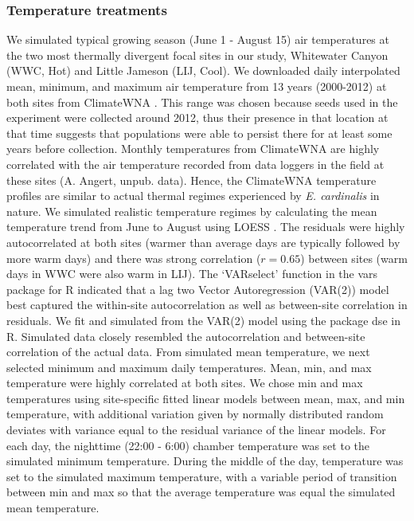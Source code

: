 \documentclass[11pt, oneside]{article}
\newcommand{\pkg}[1]{{\fontseries{b}\selectfont #1}}
\begin{document}
\subsubsection*{Temperature treatments}

We simulated typical growing season (June 1 - August 15) air temperatures at the two most thermally divergent focal sites in our study, Whitewater Canyon (WWC, Hot) and Little Jameson (LIJ, Cool). We downloaded daily interpolated mean, minimum, and maximum air temperature from 13 years (2000-2012) at both sites from ClimateWNA \citep{Wang_etal_2012}. This range was chosen because seeds used in the experiment were collected around 2012, thus their presence in that location at that time suggests that populations were able to persist there for at least some years before collection. Monthly temperatures from ClimateWNA are highly correlated with the air temperature recorded from data loggers in the field at these sites (A. Angert, unpub. data). Hence, the ClimateWNA temperature profiles are similar to actual thermal regimes experienced by \textit{E. cardinalis} in nature. We simulated realistic temperature regimes by calculating the mean temperature trend from June to August using LOESS \citep{Cleveland_etal_1992}. The residuals were highly autocorrelated at both sites (warmer than average days are typically followed by more warm days) and there was strong correlation ($r = 0.65$) between sites (warm days in WWC were also warm in LIJ). The `VARselect' function in the \pkg{vars} package for R \citep{Pfaff_2008} indicated that a lag two Vector Autoregression (VAR(2)) model best captured the within-site autocorrelation as well as between-site correlation in residuals. We fit and simulated from the VAR(2) model using the package \pkg{dse} \citep{Gilbert_2014} in R. Simulated data closely resembled the autocorrelation and between-site correlation of the actual data. From simulated mean temperature, we next selected minimum and maximum daily temperatures. Mean, min, and max temperature were highly correlated at both sites. We chose min and max temperatures using site-specific fitted linear models between mean, max, and min temperature, with additional variation given by normally distributed random deviates with variance equal to the residual variance of the linear models. For each day, the nighttime (22:00 - 6:00) chamber temperature was set to the simulated minimum temperature. During the middle of the day, temperature was set to the simulated maximum temperature, with a variable period of transition between min and max so that the average temperature was equal the simulated mean temperature.
\end{document}
